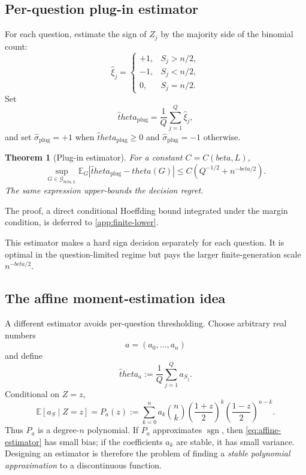 \documentclass[11pt]{article}
\def\beta{beta}%
\def\theta{theta}%
\newtheorem{theorem}{Theorem}[section]
\newcommand{\E}{\mathbb E}
\newcommand{\sgn}{\operatorname{sgn}}
\newcommand{\calG}{\mathcal G}
\newcommand\ced[1]{{\color{teal!70!black} #1}}
\begin{document}
\subsection{Per-question plug-in estimator}

For each question, estimate the sign of $Z_j$ by the majority side of the binomial count:
\[
\widehat\xi_j
=
\begin{cases}
+1,&S_j>n/2,\\
-1,&S_j<n/2,\\
0,&S_j=n/2.
\end{cases}
\]
Set
\[
\widehat\theta_{\mathrm{plug}}
=
\frac1Q\sum_{j=1}^Q\widehat\xi_j,
\]
\ced{and set $\widehat\sigma_{\mathrm{plug}}=+1$ when $\widehat\theta_{\mathrm{plug}}\ge0$ and $\widehat\sigma_{\mathrm{plug}}=-1$ otherwise.}

\begin{theorem}[Plug-in estimator]
\label{thm:plugin-scalar}
For a constant $C=C(\beta,L)$,
\begin{equation}
\label{eq:plugin-scalar}
\sup_{G\in\calG_{\beta,L}}
\E_G|\widehat\theta_{\mathrm{plug}}-\theta(G)|
\le
C\left(Q^{-1/2}+n^{-\beta/2}\right).
\end{equation}
The same expression upper-bounds the decision regret.
\end{theorem}
The proof, a direct conditional Hoeffding bound integrated under the margin condition, is deferred to \cref{app:finite-lower}.

This estimator makes a hard sign decision separately for each question.  It is optimal in the question-limited regime but pays the larger finite-generation scale $n^{-\beta/2}$.

\subsection{The affine moment-estimation idea}

A different estimator avoids per-question thresholding.  Choose arbitrary real numbers
\[
a=(a_0,\dots,a_n)
\]
and define
\begin{equation}
\label{eq:affine-estimator}
\widehat\theta_a
:=
\frac1Q\sum_{j=1}^Q a_{S_j}.
\end{equation}
Conditional on $Z=z$,
\begin{equation}
\label{eq:Pa}
\E[a_S\mid Z=z]
=
P_a(z)
:=
\sum_{k=0}^n a_k
\binom nk
\left(\frac{1+z}{2}\right)^k
\left(\frac{1-z}{2}\right)^{n-k}.
\end{equation}
Thus $P_a$ is a degree-$n$ polynomial.  If $P_a$ approximates $\sgn$, then \eqref{eq:affine-estimator} has small bias; if the coefficients $a_k$ are stable, it has small variance.  Designing an estimator is therefore the problem of finding a \emph{stable polynomial approximation} to a discontinuous function.
\end{document}
